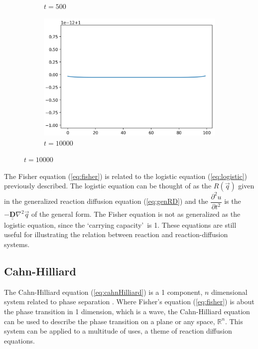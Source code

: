 \documentclass[12pt, letterpaper]{article}
\newcommand{\sorta}[1]{\lq #1\rq \,}
\begin{document}
\begin{figure}[h]
\begin{subfigure}[b]{.23\linewidth}
    \caption{$t=500$}
  \end{subfigure}
  \begin{subfigure}[b]{.23\linewidth}
    \includegraphics[width=\linewidth]{Fisher/f10000.png}
    \caption{$t=10000$}
  \end{subfigure}
\end{figure}

The Fisher equation (\ref{eq:fisher}) is related to the logistic equation (\ref{eq:logistic}) previously
described. The logistic equation can be thought of as the $R(\vec{q})$ given in the generalized
reaction diffusion equation (\ref{eq:genRD}) and the $\dfrac{\partial^2 u}{\partial t^2}$ is the 
$ - \underline{\underline{\mathbf{D}}} \nabla^2 \vec{q} $ of the general form. The Fisher equation is not as
generalized as the logistic equation, since the \sorta{carrying capacity} is 1. These equations are
still useful for illustrating the relation between reaction and reaction-diffusion systems.

\subsection{Cahn-Hilliard} \label{cahnhilliard}

The Cahn-Hilliard equation (\ref{eq:cahnHilliard}) is a 1 component, $n$ dimensional system related to phase 
separation \citep{cahnhilliard}. Where Fisher's equation (\ref{eq:fisher}) is about the phase transition in 1
dimension, which is a wave,
the Cahn-Hilliard equation can be used to describe the phase transition on a plane or any space,
$\mathbb{R}^n$. This system can be applied to a multitude of uses, a theme of reaction diffusion equations.
\end{document}
